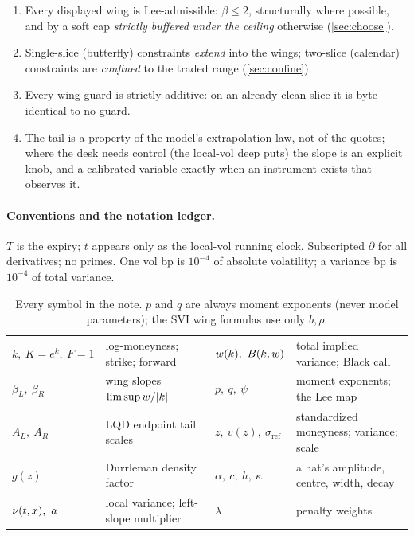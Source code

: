 \documentclass[11pt]{article}
\newcommand{\bL}{\beta_L}
\newcommand{\bR}{\beta_R}
\newcommand{\AL}{A_L}
\newcommand{\AR}{A_R}
\begin{document}
\begin{invariant}
\begin{enumerate}[leftmargin=1.6em]
\item Every displayed wing is Lee-admissible: $\beta\le2$, structurally
where possible, and by a soft cap \emph{strictly buffered under the
ceiling} otherwise (\cref{sec:choose}).
\item Single-slice (butterfly) constraints \emph{extend} into the wings;
two-slice (calendar) constraints are \emph{confined} to the traded range
(\cref{sec:confine}).
\item Every wing guard is strictly additive: on an already-clean slice it
is byte-identical to no guard.
\item The tail is a property of the model's extrapolation law, not of
the quotes; where the desk needs control (the local-vol deep puts) the
slope is an explicit knob, and a calibrated variable exactly when an
instrument exists that observes it.
\end{enumerate}
\end{invariant}

\paragraph{Conventions and the notation ledger.}
$T$ is the expiry; $t$ appears only as the local-vol running clock.
Subscripted $\partial$ for all derivatives; no primes.  One vol bp is
$10^{-4}$ of absolute volatility; a variance bp is $10^{-4}$ of total
variance.

\begin{table}[H]
\centering\footnotesize
\setlength{\tabcolsep}{3pt}
\begin{tabular}{@{}llll@{}}
\toprule
$k,\ K=e^{k},\ F=1$ & log-moneyness; strike; forward &
$\tvar(k),\ \Black(k,\tvar)$ & total implied variance; Black call\\[2pt]
$\bL,\ \bR$ & wing slopes $\limsup w/|k|$ &
$p,\ q,\ \psi$ & moment exponents; the Lee map\\[2pt]
$\AL,\ \AR$ & LQD endpoint tail scales &
$z,\ v(z),\ \sigma_{\mathrm{ref}}$ & standardized moneyness; variance; scale\\[2pt]
$g(z)$ & Durrleman density factor &
$\alpha,\ c,\ h,\ \kappa$ & a hat's amplitude, centre, width, decay\\[2pt]
$\locvar(t,x),\ a$ & local variance; left-slope multiplier &
$\lambda$ & penalty weights\\
\bottomrule
\end{tabular}
\caption{Every symbol in the note.  $p$ and $q$ are always moment
exponents (never model parameters); the SVI wing formulas use only
$b,\rho$.}
\label{tab:ledger}
\end{table}
\end{document}
